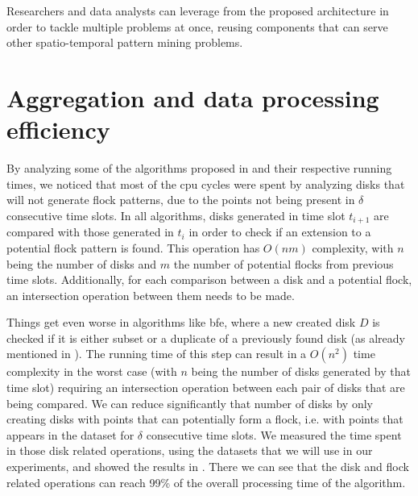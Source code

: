 Researchers and data analysts can leverage from the proposed architecture in order to tackle multiple problems at once,
reusing components that can serve other spatio-temporal pattern mining problems.

\section{Aggregation and data processing efficiency}
\label{sec:bitdf}
By analyzing some of the algorithms proposed in  and their respective running times, we noticed
that most of the \ac{cpu} cycles were spent by analyzing disks that will not generate flock patterns, due to the points
not being present in $\delta$ consecutive time slots. In all algorithms, disks generated in time slot $t_{i+1}$ are
compared with those generated in $t_{i}$ in order to check if an extension to a potential flock pattern is found. This
operation has $O(nm)$ complexity, with $n$ being the number of disks and $m$ the number of potential flocks from
previous time slots.  Additionally, for each comparison between a disk and a potential flock, an intersection operation
between them needs to be made.

Things get even worse in algorithms like \ac{bfe}, where a new created disk $D$ is checked if it is either subset or a
duplicate of a previously found disk (as already mentioned in ). The running time of this
step can result in a $O(n^2)$ time complexity in the worst case (with $n$ being the number of disks generated by that
time slot) requiring an intersection operation between each pair of disks that are being compared. We can reduce
significantly that number of disks by only creating disks with points that can potentially form a flock, i.e. with
points that appears in the dataset for $\delta$ consecutive time slots. We measured the time spent in those disk related
operations, using the datasets that we will use in our experiments, and showed the results in
. There we can see that the disk and flock related operations can reach 99\% of the overall
processing time of the algorithm.

